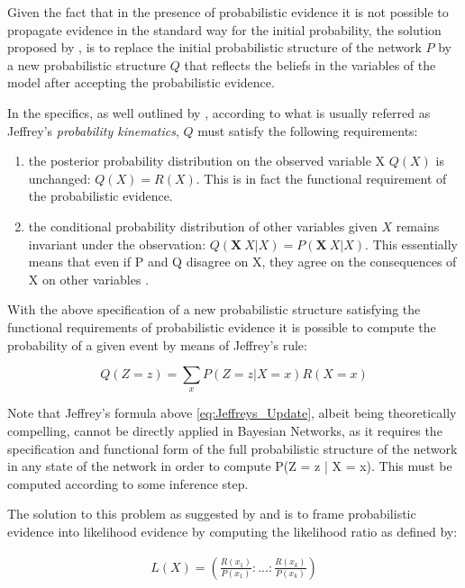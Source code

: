 \documentclass[11pt]{article}
\begin{document}
Given the fact that in the presence of probabilistic evidence it is
not possible to propagate evidence in the standard way for the
initial probability, the solution proposed by \cite{jeffrey1990logic},
is to replace the initial probabilistic structure of the network \(P\)
by a new probabilistic structure \(Q\) that reflects the beliefs in
the variables of the model after accepting the probabilistic
evidence.

In the specifics, as well outlined by \cite{Mrad_2015}, according to
what is usually referred as Jeffrey's \emph{probability kinematics}, \(Q\)
must satisfy the following requirements:

\begin{enumerate}
\item the posterior probability distribution on the observed variable X
\(Q(X)\) is unchanged: \(Q(X) = R(X)\). This is in fact the
functional requirement of the probabilistic evidence.

\item the conditional probability distribution of other variables given
\(X\) remains invariant under the observation: \(Q(\textbf{X} \
     {X} | X) = P (\textbf{X} \ {X} | X)\). This essentially means that
even if P and Q disagree on X, they agree on the consequences of
X on other variables \cite{Mrad_2015}.
\end{enumerate}

With the above specification of a new probabilistic structure
satisfying the functional requirements of probabilistic evidence it
is possible to compute the probability of a given event by means of
Jeffrey's rule:

\begin{equation} \label{eq:Jeffreys_Update}
 Q(Z = z) = \sum_x P(Z = z | X = x) R(X = x)
\end{equation}

Note that Jeffrey's formula above \ref{eq:Jeffreys_Update}, albeit
being theoretically compelling, cannot be directly applied in
Bayesian Networks, as it requires the specification and functional
form of the full probabilistic structure of the network in any state
of the network in order to compute P(Z = z | X = x). This must be
computed according to some inference step.

The solution to this problem as suggested by \cite{Chan_2005} and
\cite{PENG_2010} is to frame probabilistic evidence into likelihood
evidence by computing the likelihood ratio as defined by:

\begin{align} \label{eq:probabilistic-to-likelihood-evidence}
 L(X) = (\frac{R(x_1)}{P(x_1)}: ... : \frac{R(x_k)}{P(x_k)})
\end{align}
\end{document}
